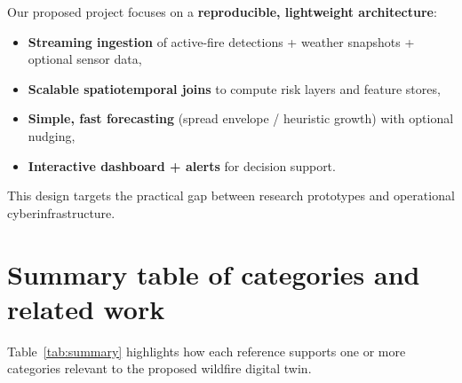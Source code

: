 \documentclass[acmsmall,screen,nonacm]{acmart}
\begin{document}
Our proposed project focuses on a \textbf{reproducible, lightweight architecture}:
\begin{itemize}
  \item \textbf{Streaming ingestion} of active-fire detections + weather snapshots + optional sensor data,
  \item \textbf{Scalable spatiotemporal joins} to compute risk layers and feature stores,
  \item \textbf{Simple, fast forecasting} (spread envelope / heuristic growth) with optional nudging,
  \item \textbf{Interactive dashboard + alerts} for decision support.
\end{itemize}
This design targets the practical gap between research prototypes and operational cyberinfrastructure.

\section{Summary table of categories and related work}
Table~\ref{tab:summary} highlights how each reference supports one or more categories relevant to the proposed
wildfire digital twin.
\end{document}
